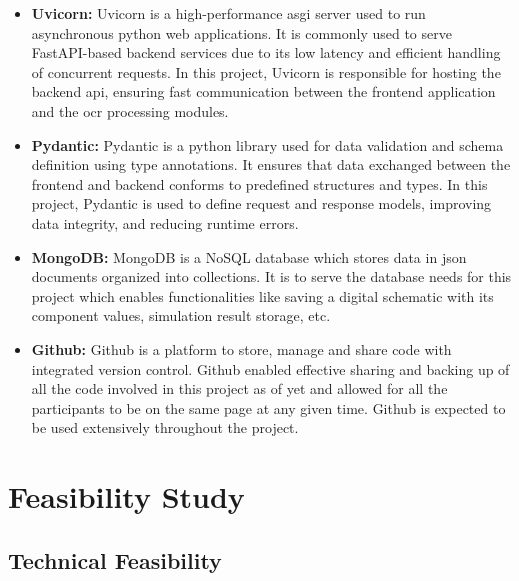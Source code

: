 \begin{itemize}
    \item \textbf{Uvicorn:} Uvicorn is a high-performance \gls{asgi} server used to run asynchronous \gls{python} web applications. It is commonly used to serve FastAPI-based backend services due to its low latency and efficient handling of concurrent requests. In this project, Uvicorn is responsible for hosting the backend \gls{api}, ensuring fast communication between the frontend application and the \gls{ocr} processing modules.
    
    \item \textbf{Pydantic:} Pydantic is a \gls{python} library used for data validation and schema definition using type annotations. It ensures that data exchanged between the frontend and backend conforms to predefined structures and types. In this project, Pydantic is used to define request and response models, improving data integrity, and reducing runtime errors.
    
    \item \textbf{MongoDB:} MongoDB is a NoSQL database which stores data in \gls{json} documents organized into collections. It is to serve the database needs for this project which enables functionalities like saving a digital schematic with its component values, simulation result storage, etc.
    
    \item \textbf{Github:} Github is a platform to store, manage and share code with integrated version control. Github enabled effective sharing and backing up of all the code involved in this project as of yet and allowed for all the participants to be on the same page at any given time. Github is expected to be used extensively throughout the project.
\end{itemize}

\section{Feasibility Study}

\subsection{Technical Feasibility}

